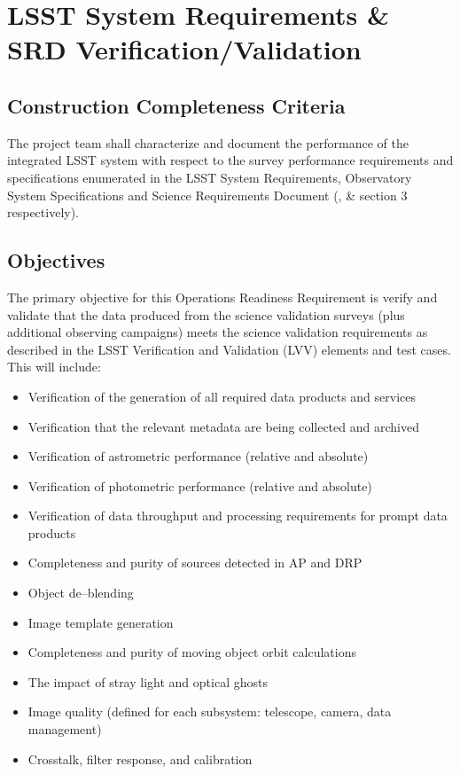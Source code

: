 \section{LSST System Requirements \& SRD Verification/Validation}  \label{sec:srd}

\subsection{Construction Completeness Criteria}
The project team shall characterize and document the performance of the integrated LSST system with respect to the survey performance requirements and specifications enumerated in the LSST System Requirements, Observatory System Specifications and Science Requirements Document (,  \&  section 3 respectively).

\subsection{Objectives}

The primary objective for this Operations Readiness Requirement is verify and validate that the data produced from the science validation surveys (plus additional observing campaigns) meets the science validation requirements as described in the LSST Verification and Validation (LVV) elements and test cases. This will include:

\begin{itemize}

	\item Verification of the generation of all required data products and services
 	\item Verification that the relevant metadata are being collected and archived
	\item Verification of astrometric performance (relative and absolute)
	\item Verification of photometric performance (relative and absolute)
	\item Verification of data throughput and processing requirements for prompt data products  
	\item Completeness and purity of sources detected in AP and DRP
	\item Object de--blending
	\item Image template generation
	\item Completeness and purity of moving object orbit calculations
	\item The impact of stray light and optical ghosts 
	\item Image quality (defined for each subsystem: telescope, camera, data management)
	\item Crosstalk, filter response, and calibration
	
\end{itemize}

